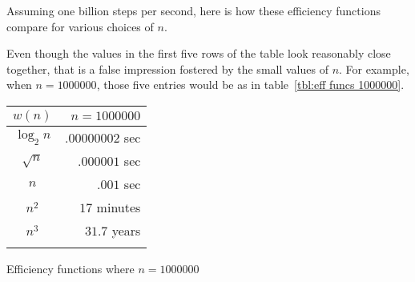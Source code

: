 Assuming one billion steps per second, here is how these
efficiency functions compare for various choices of $n$.
\begin{table}[h!t]
\centering
{}
\caption{Common efficiency functions for small values of $n$}
\end{table}

Even though the values in the first five rows of the table look 
reasonably close together, that is a false impression fostered
by the small values of $n$. For example, when $n = 1000000$,
those five entries would be as in table~\ref{tbl:eff funcs 1000000}.
\begin{margintable}
\centering
\begin{tabular}{c r}
\toprule\addlinespace
$w(n)$ & $n=1000000$\\ 
\midrule\addlinespace
$\log_2{n}$ & $.00000002$ sec \\ 
$\sqrt{n}$ &   $.000001$ sec \\ 
$n$ & $.001$ sec\\ 
$n^2$ &   $17$ minutes \\ 
$n^3$ & $31.7$ years \\ 
\bottomrule\addlinespace
\end{tabular}
\caption{Efficiency functions where $n=1000000$}\label{tbl:eff funcs 1000000}
\end{margintable}


